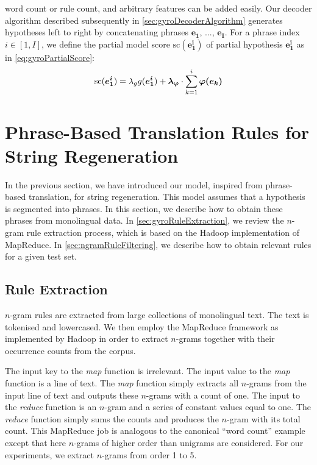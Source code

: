 word count or rule count, and arbitrary features can be added easily.
Our decoder algorithm described subsequently in
\autoref{sec:gyroDecoderAlgorithm} generates hypotheses left to right
by concatenating phrases $\bm{e_1}$, ..., $\bm{e_I}$. For a phrase index $i \in [1, I]$,
we define the partial model score $\text{sc}(\bm{e_1^i})$ of partial hypothesis $\bm{e_1^i}$ as
in \autoref{eq:gyroPartialScore}:
%
\begin{equation}
  \text{sc}(\bm{e_1^i}) = \lambda_g g(\bm{e_1^i}) + \bm{\lambda_{\varphi}} \cdot \sum_{k = 1}^i \bm{\varphi(e_k)} \\
  \label{eq:gyroPartialScore}
\end{equation}

\section{Phrase-Based Translation Rules for String Regeneration}
\label{sec:gyroPhraseBasedRules}

In the previous section, we have introduced our model, inspired from
phrase-based translation, for string regeneration.
This model assumes that a hypothesis is segmented into phrases.
In this section, we describe how to obtain these phrases
from monolingual data. In \autoref{sec:gyroRuleExtraction}, we review
the $n$-gram rule extraction process, which is based on the Hadoop implementation
of MapReduce. In \autoref{sec:ngramRuleFiltering}, we describe how to obtain
relevant rules for a given test set.

\subsection{Rule Extraction}
\label{sec:gyroRuleExtraction}

$n$-gram rules are extracted from large collections of monolingual
text. The text is tokenised and lowercased. We then
employ the MapReduce
framework as implemented by Hadoop in order to extract %
$n$-grams together with their occurrence counts from the corpus.

The input key to the \emph{map} function is irrelevant.
The input value to the \emph{map} function is a line of text.
The \emph{map} function simply extracts all $n$-grams from the
input line of text and outputs these $n$-grams with a count of
one. The input to the \emph{reduce} function is an $n$-gram
and a series of constant values equal to one.
The \emph{reduce} function simply sums the counts
and produces the $n$-gram with its total count. This MapReduce
job is analogous to the canonical ``word count'' example except
that here $n$-grams of higher order than unigrams are considered.
For our experiments, we extract $n$-grams from order 1 to 5. %

